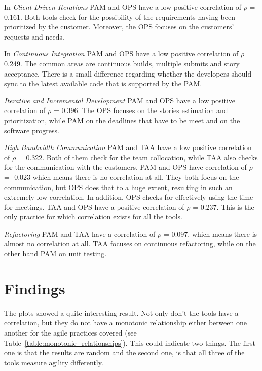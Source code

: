 In \textit{Client-Driven Iterations} \ac{PAM} and \ac{OPS} have a low positive correlation of $\rho$ = 0.161. Both tools check for the possibility of the requirements having been prioritized by the customer. Moreover, the \ac{OPS} focuses on the customers' requests and needs.

In \textit{Continuous Integration} \ac{PAM} and \ac{OPS} have a low positive correlation of $\rho$ = 0.249. The common areas are continuous builds, multiple submits and story acceptance. There is a small difference regarding whether the developers should sync to the latest available code that is supported by the \ac{PAM}.

\textit{Iterative and Incremental Development} \ac{PAM} and \ac{OPS} have a low positive correlation of $\rho$ = 0.396. The \ac{OPS} focuses on the stories estimation and prioritization, while \ac{PAM} on the deadlines that have to be meet and on the software progress. 

\textit{High Bandwidth Communication} \ac{PAM} and \ac{TAA} have a low positive correlation of $\rho$ = 0.322. Both of them check for the team collocation, while \ac{TAA} also checks for the communication with the customers. \ac{PAM} and \ac{OPS} have correlation of $\rho$ = -0.023 which means there is no correlation at all. They both focus on the communication, but \ac{OPS} does that to a huge extent, resulting in such an extremely low correlation. In addition, \ac{OPS} checks for effectively using the time for meetings. \ac{TAA} and \ac{OPS} have a positive correlation of $\rho$ = 0.237. This is the only practice for which correlation exists for all the tools.

\textit{Refactoring} \ac{PAM} and \ac{TAA} have a correlation of $\rho$ = 0.097, which means there is almost no correlation at all. \ac{TAA} focuses on continuous refactoring, while on the other hand \ac{PAM} on unit testing.


\section{Findings}
\label{sec:findings}

The plots showed a quite interesting result. Not only don’t the tools have a correlation, but they do not have a monotonic relationship either between one another for the agile practices covered (see Table~\ref{table:monotonic_relationships}). This could indicate two things. The first one is that the results are random and the second one, is that all three of the tools measure agility differently. 

